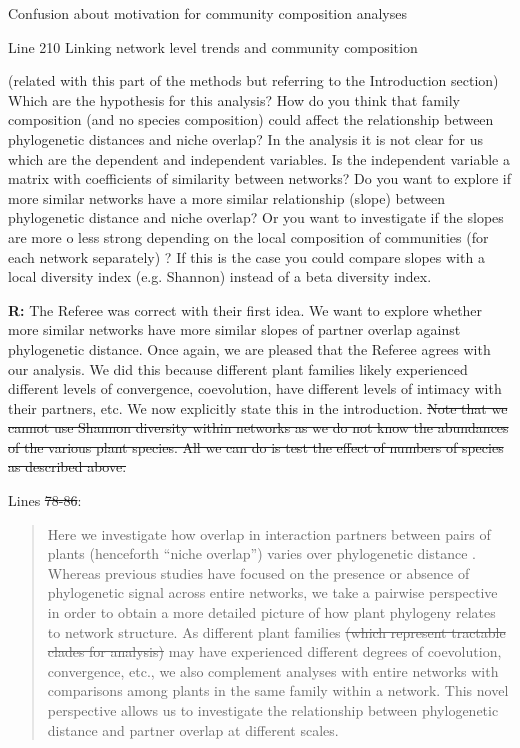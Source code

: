 \documentclass[12pt]{letter}
\newenvironment{refquote}{\bigskip \begin{it}}{\end{it}\smallskip}
\providecommand{\DIFadd}[1]{{\protect\color{blue}\uwave{#1}}} %
\providecommand{\DIFdel}[1]{{\protect\color{red}\sout{#1}}}                      %
\providecommand{\DIFaddbegin}{} %
\providecommand{\DIFaddend}{} %
\providecommand{\DIFdelbegin}{} %
\providecommand{\DIFdelend}{} %
\newcommand{\DIFscaledelfig}{0.5}
\newlength{\DIFdelgraphicswidth} %
\newlength{\DIFdelgraphicsheight} %
\newcommand{\DIFaddincludegraphics}[2][]{{\color{blue}\fbox{\DIFOincludegraphics[#1]{#2}}}} %
\newcommand{\DIFdelincludegraphics}[2][]{%
\sbox{\DIFdelgraphicsbox}{\DIFOincludegraphics[#1]{#2}}%
\settoboxwidth{\DIFdelgraphicswidth}{\DIFdelgraphicsbox} %
\settoboxtotalheight{\DIFdelgraphicsheight}{\DIFdelgraphicsbox} %
\scalebox{\DIFscaledelfig}{%
\parbox[b]{\DIFdelgraphicswidth}{\usebox{\DIFdelgraphicsbox}\\[-\baselineskip] \rule{\DIFdelgraphicswidth}{0em}}\llap{\resizebox{\DIFdelgraphicswidth}{\DIFdelgraphicsheight}{%
\setlength{\unitlength}{\DIFdelgraphicswidth}%
\begin{picture}(1,1)%
\thicklines\linethickness{2pt} %
{\color[rgb]{1,0,0}\put(0,0){\framebox(1,1){}}}%
{\color[rgb]{1,0,0}\put(0,0){\line( 1,1){1}}}%
{\color[rgb]{1,0,0}\put(0,1){\line(1,-1){1}}}%
\end{picture}%
}\hspace*{3pt}}} %
} %
\DeclareRobustCommand{\DIFaddbegin}{\DIFOaddbegin \let\includegraphics\DIFaddincludegraphics} %
\DeclareRobustCommand{\DIFaddend}{\DIFOaddend \let\includegraphics\DIFOincludegraphics} %
\DeclareRobustCommand{\DIFdelbegin}{\DIFOdelbegin \let\includegraphics\DIFdelincludegraphics} %
\DeclareRobustCommand{\DIFdelend}{\DIFOaddend \let\includegraphics\DIFOincludegraphics} %
\begin{document}
	\DIFadd{17. }\DIFaddend Confusion about motivation for community composition analyses

		\begin{refquote}
			Line 210 Linking network level trends and community composition

			(related with this part of the methods but referring to the Introduction section) Which are the hypothesis for this analysis? How do you think that family composition (and no species composition) could affect the relationship between phylogenetic  distances and niche overlap?
			In the analysis it is not clear for us which are the dependent and independent variables. Is the independent variable a matrix with coefficients of similarity between networks?  Do you want to explore if more similar networks have a more similar relationship (slope) between phylogenetic distance and niche overlap? Or you want to investigate if the slopes are more o less strong depending on the local composition of communities (for each network separately) ? If this is the case you could compare slopes with a local diversity index (e.g. Shannon) instead of a beta diversity index.
		\end{refquote}


		\textbf{R:} The Referee was correct with their first idea. We want to explore whether more similar networks have more similar slopes of partner overlap against phylogenetic distance. Once again, we are pleased that the Referee agrees with our analysis. We did this because different plant families likely experienced different levels of convergence, coevolution, have different levels of intimacy with their partners, etc. We now explicitly state this in the introduction.
\DIFdelbegin \DIFdel{Note that we cannot use Shannon diversity within networks as we do not know the abundances of the various plant species. All we can do is test the effect of numbers of species as described above.
}\DIFdelend 


		Lines \DIFdelbegin \DIFdel{78-86}\DIFdelend \DIFaddbegin \DIFadd{XX-XX}\DIFaddend :

		\begin{quotation}

		  Here we investigate how overlap in interaction partners between 
		  pairs of plants (henceforth ``niche overlap'') varies over 
		  phylogenetic distance \DIFaddbegin \DIFadd{and how this differs between plant families}\DIFaddend . 
		  Whereas previous 
		  studies have focused on the presence or absence of phylogenetic
		  signal across entire networks, we take a pairwise perspective in
		  order to obtain a more detailed picture of how plant phylogeny
		  relates to network structure. As different plant families \DIFdelbegin \DIFdel{(which represent tractable clades for analysis) }\DIFdelend may have experienced different degrees of coevolution, convergence, etc., we also complement analyses with entire networks with comparisons among plants in the same family within a network. 
		  This novel perspective allows us to investigate the relationship between phylogenetic distance and partner overlap at different scales. 

  		\end{quotation}
\end{document}
